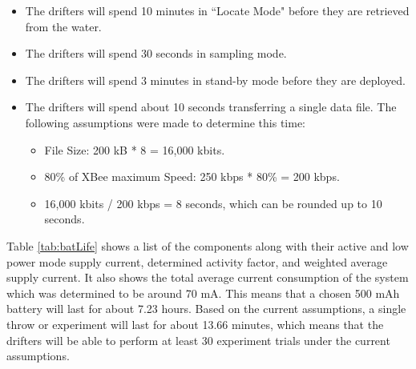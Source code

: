 \begin{itemize}
\item The drifters will spend 10 minutes in ``Locate Mode" before they are retrieved from the water.
\item The drifters will spend 30 seconds in sampling mode.
\item The drifters will spend 3 minutes in stand-by mode before they are deployed.
\item The drifters will spend about 10 seconds transferring a single data file.  The following assumptions were made to determine this time:
	\begin{itemize}
		\item File Size: 200 kB * 8 = 16,000 kbits.
		\item 80\% of XBee maximum Speed: 250 kbps * 80\% = 200 kbps.
		\item 16,000 kbits / 200 kbps = 8 seconds, which can be rounded up to 10 seconds.
	\end{itemize}
\end{itemize}


Table \ref{tab:batLife} shows a list of the components along with their active and low power mode supply current, determined activity factor, and weighted average supply current.  It also shows the total average current consumption of the system which was determined to be  around 70 mA.  This means that a chosen 500 mAh battery will last for about 7.23 hours.  Based on the current assumptions, a single throw or experiment will last for about 13.66 minutes, which means that the drifters will be able to perform at least 30 experiment trials under the current assumptions.

